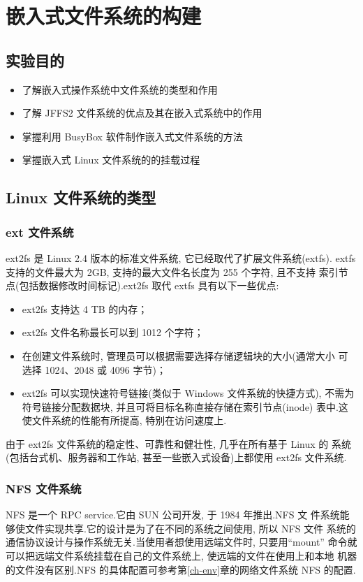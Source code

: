 \chapter{嵌入式文件系统的构建}\label{ch-fs}

\section{实验目的}
\begin{itemize}\itemsep=-3pt
  \item 了解嵌入式操作系统中文件系统的类型和作用
  \item 了解 JFFS2 文件系统的优点及其在嵌入式系统中的作用
  \item 掌握利用 BusyBox 软件制作嵌入式文件系统的方法
  \item 掌握嵌入式 Linux 文件系统的的挂载过程
\end{itemize}

\section{Linux 文件系统的类型}
\subsection{ext 文件系统}
	ext2fs 是 Linux 2.4 版本的标准文件系统, 它已经取代了扩展文件系统(extfs).
extfs 支持的文件最大为 2GB, 支持的最大文件名长度为 255 个字符, 且不支持
索引节点(包括数据修改时间标记).ext2fs 取代 extfs 具有以下一些优点:
\begin{itemize}\itemsep=-3pt
  \item ext2fs 支持达 4 TB 的内存；
  \item ext2fs 文件名称最长可以到 1012 个字符；
  \item 在创建文件系统时, 管理员可以根据需要选择存储逻辑块的大小(通常大小
		可选择 1024、2048 或 4096 字节)；
  \item ext2fs 可以实现快速符号链接(类似于 Windows 文件系统的快捷方式), 
		不需为符号链接分配数据块, 并且可将目标名称直接存储在索引节点(inode)
		表中.这使文件系统的性能有所提高, 特别在访问速度上.
\end{itemize}
	由于 ext2fs 文件系统的稳定性、可靠性和健壮性, 几乎在所有基于 Linux 的
系统(包括台式机、服务器和工作站, 甚至一些嵌入式设备)上都使用 ext2fs 文件系统.

\subsection{NFS 文件系统}
	NFS 是一个 RPC service.它由 SUN 公司开发, 于 1984 年推出.NFS 文
件系统能够使文件实现共享.它的设计是为了在不同的系统之间使用, 所以 NFS 文件
系统的通信协议设计与操作系统无关.当使用者想使用远端文件时, 只要用``mount''
命令就可以把远端文件系统挂载在自己的文件系统上, 使远端的文件在使用上和本地
机器的文件没有区别.NFS 的具体配置可参考第\ref{ch-env}章的网络文件系统 NFS
的配置.

